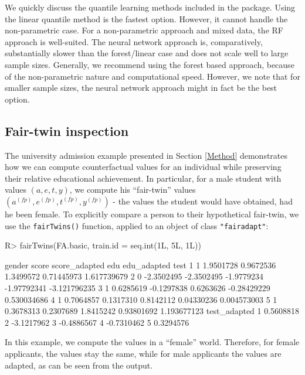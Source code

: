 \documentclass[
  notitle]{jss}
\begin{document}
We quickly discuss the quantile learning methods included in the
package. Using the linear quantile method is the fastest option.
However, it cannot handle the non-parametric case. For a non-parametric
approach and mixed data, the RF approach is well-suited. The neural
network approach is, comparatively, substantially slower than the
forest/linear case and does not scale well to large sample sizes.
Generally, we recommend using the forest based approach, because of the
non-parametric nature and computational speed. However, we note that for
smaller sample sizes, the neural network approach might in fact be the
best option.

\hypertarget{fair-twin-inspection}{%
\subsection{Fair-twin inspection}\label{fair-twin-inspection}}

The university admission example presented in Section \ref{Method}
demonstrates how we can compute counterfactual values for an individual
while preserving their relative educational achievement. In particular,
for a male student with values \((a, e, t, y)\), we compute his
``fair-twin'' values
\(( {a}^{(fp)},  {e}^{(fp)},  {t}^{(fp)},  {y}^{(fp)})\) - the values
the student would have obtained, had he been female. To explicitly
compare a person to their hypothetical fair-twin, we use the
\texttt{fairTwins()} function, applied to an object of class
\texttt{"fairadapt"}:

\begin{CodeChunk}
\begin{CodeInput}
R> fairTwins(FA.basic, train.id = seq.int(1L, 5L, 1L))
\end{CodeInput}
\begin{CodeOutput}
  gender      score score_adapted        edu edu_adapted         test
1      1  1.9501728     0.9672536  1.3499572  0.71445973  1.617739679
2      0 -2.3502495    -2.3502495 -1.9779234 -1.97792341 -3.121796235
3      1  0.6285619    -0.1297838  0.6263626 -0.28429229  0.530034686
4      1  0.7064857     0.1317310  0.8142112  0.04330236  0.004573003
5      1  0.3678313     0.2307689  1.8415242  0.93801692  1.193677123
  test_adapted
1    0.5608818
2   -3.1217962
3   -0.4886567
4   -0.7310462
5    0.3294576
\end{CodeOutput}
\end{CodeChunk}

In this example, we compute the values in a ``female'' world. Therefore,
for female applicants, the values stay the same, while for male
applicants the values are adapted, as can be seen from the output.
\end{document}
